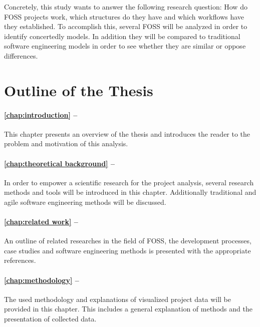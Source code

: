 Concretely, this study wants to answer the following research question: How do
\ac{FOSS} projects work, which structures do they have and which workflows have
they established. To accomplish this, several \ac{FOSS} will be analyzed in
order to identify concertedly models. In addition they will be compared to
traditional software engineering models in order to see whether they are
similar or oppose differences.


\section{Outline of the Thesis} %

\paragraph{\autoref{chap:introduction} -- }

This chapter presents an overview of the thesis and introduces the reader to
the problem and motivation of this analysis.

\paragraph{\autoref{chap:theoretical background} -- }

In order to empower a scientific research for the project analysis, several
research methods and tools will be introduced in this chapter. Additionally
traditional and agile software engineering methods will be discussed.

\paragraph{\autoref{chap:related work} -- }

An outline of related researches in the field of \ac{FOSS}, the development
processes, case studies and software engineering methods is presented with the
appropriate references.

\paragraph{\autoref{chap:methodology} -- }

The used methodology and explanations of visualized project data will be
provided in this chapter. This includes a general explanation of methods and
the presentation of collected data.

